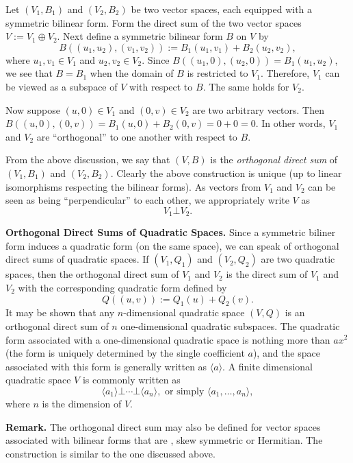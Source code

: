\documentclass[12pt]{article}
\begin{document}
Let $(V_1,B_1)$ and $(V_2,B_2)$ be two vector spaces, each equipped with a symmetric bilinear form.  Form the direct sum of the two vector spaces $V:=V_1\oplus V_2$.  Next define a symmetric bilinear form $B$ on $V$ by
$$B((u_1,u_2),(v_1,v_2)):=B_1(u_1,v_1)+B_2(u_2,v_2),$$
where $u_1,v_1\in V_1$ and $u_2,v_2\in V_2$.  Since $B((u_1,0),(u_2,0))=B_1(u_1,u_2)$, we see that $B=B_1$ when the domain of $B$ is restricted to $V_1$.  Therefore, $V_1$ can be viewed as a subspace of $V$ with respect to $B$.  The same holds for $V_2$. 
 
Now suppose $(u,0)\in V_1$ and $(0,v)\in V_2$ are two arbitrary vectors.  Then $B((u,0),(0,v))=B_1(u,0)+B_2(0,v)=0+0=0$.  In other words, $V_1$ and $V_2$ are ``orthogonal'' to one another with respect to $B$.

From the above discussion, we say that $(V,B)$ is the \emph{orthogonal direct sum} of $(V_1,B_1)$ and $(V_2,B_2)$.  Clearly the above construction is unique (up to linear isomorphisms respecting the bilinear forms).  As vectors from $V_1$ and $V_2$ can be seen as being ``perpendicular'' to each other, we appropriately write $V$ as $$V_1\bot V_2.$$

\textbf{Orthogonal Direct Sums of Quadratic Spaces.}  Since a symmetric biliner form induces a quadratic form (on the same space), we can speak of orthogonal direct sums of quadratic spaces.  If $(V_1,Q_1)$ and $(V_2,Q_2)$ are two quadratic spaces, then the orthogonal direct sum of $V_1$ and $V_2$ is the direct sum of $V_1$ and $V_2$ with the corresponding quadratic form defined by 
$$Q((u,v)):=Q_1(u)+Q_2(v).$$
It may be shown that any $n$-dimensional quadratic space $(V,Q)$ is an orthogonal direct sum of $n$ one-dimensional quadratic subspaces.  The quadratic form associated with a one-dimensional quadratic space is nothing more than $ax^2$ (the form is uniquely determined by the single coefficient $a$), and the space associated with this form is generally written as $\langle a\rangle$.  A finite dimensional quadratic space $V$ is commonly written as $$\langle a_1\rangle \bot \cdots \bot \langle a_n \rangle,\mbox{ or simply } \langle a_1,\ldots,a_n\rangle,$$ where $n$ is the dimension of $V$.

\textbf{Remark.}  The orthogonal direct sum may also be defined for vector spaces associated with bilinear forms that are , skew symmetric or Hermitian.  The construction is similar to the one discussed above.
\end{document}
